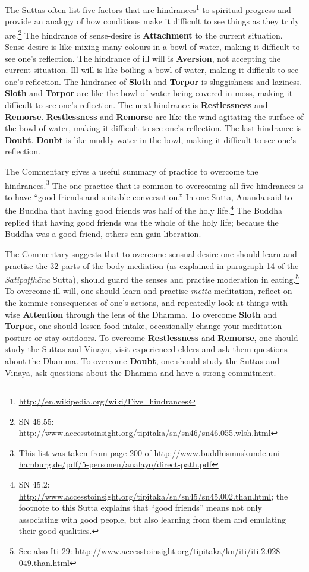 The Suttas often list five factors that are hindrances\footnote{\url{http://en.wikipedia.org/wiki/Five_hindrances}} to spiritual progress and provide an analogy of how conditions make it difficult to see things as they truly are.\footnote{SN 46.55: \url{http://www.accesstoinsight.org/tipitaka/sn/sn46/sn46.055.wlsh.html}} The hindrance of sense-desire is \textbf{Attachment} to the current situation. Sense-desire is like mixing many colours in a bowl of water, making it difficult to see one’s reflection. The hindrance of ill will is \textbf{Aversion}, not accepting the current situation. Ill will is like boiling a bowl of water, making it difficult to see one’s reflection. The hindrance of \textbf{Sloth} and \textbf{Torpor} is sluggishness and laziness. \textbf{Sloth} and \textbf{Torpor} are like the bowl of water being covered in moss, making it difficult to see one’s reflection. The next hindrance is \textbf{Restlessness} and \textbf{Remorse}. \textbf{Restlessness} and \textbf{Remorse} are like the wind agitating the surface of the bowl of water, making it difficult to see one’s reflection. The last hindrance is \textbf{Doubt}. \textbf{Doubt} is like muddy water in the bowl, making it difficult to see one’s reflection.

The Commentary gives a useful summary of practice to overcome the hindrances.\footnote{This list was taken from page 200 of \url{http://www.buddhismuskunde.uni-hamburg.de/pdf/5-personen/analayo/direct-path.pdf}} The one practice that is common to overcoming all five hindrances is to have “good friends and suitable conversation.” In one Sutta, Ānanda said to the Buddha that having good friends was half of the holy life.\footnote{SN 45.2: \url{http://www.accesstoinsight.org/tipitaka/sn/sn45/sn45.002.than.html}; the footnote to this Sutta explains that “good friends” means not only associating with good people, but also learning from them and emulating their good qualities.} The Buddha replied that having good friends was the whole of the holy life; because the Buddha was a good friend, others can gain liberation.

The Commentary suggests that to overcome sensual desire one should learn and practise the 32 parts of the body mediation (as explained in paragraph 14 of the \textit{Satipaṭṭhāna} Sutta), should guard the senses and practise moderation in eating.\footnote{See also Iti 29: \url{http://www.accesstoinsight.org/tipitaka/kn/iti/iti.2.028-049.than.html}} To overcome ill will, one should learn and practise \textit{mettā} meditation, reflect on the kammic consequences of one’s actions, and repeatedly look at things with wise \textbf{Attention} through the lens of the Dhamma. To overcome \textbf{Sloth} and \textbf{Torpor}, one should lessen food intake, occasionally change your meditation posture or stay outdoors. To overcome \textbf{Restlessness} and \textbf{Remorse}, one should study the Suttas and Vinaya, visit experienced elders and ask them questions about the Dhamma. To overcome \textbf{Doubt}, one should study the Suttas and Vinaya, ask questions about the Dhamma and have a strong commitment.

